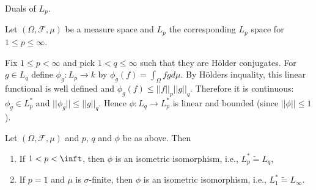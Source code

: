 

Duals of $L_p$.

Let $(\Omega,\mathcal{F},\mu)$ be a measure space
and $L_p$ the corresponding $L_p$ space for $1\leq p\leq\infty$.

Fix $1\leq p<\infty$ and pick $1<q\leq \infty$ such that they are H\"older conjugates.
For $g\in L_q$ define $\phi_g:L_p\to k$ by $\phi_g(f)=\int_\Omega fgd\mu$.
By H\"olders inquality, this linear functional is well defined and
$\phi_g(f)\leq ||f||_p||g||_q$.
Therefore it is continuous: $\phi_g\in L_p^*$
and $||\phi_g||\leq ||g||_q$.
Hence $\phi:L_q\to L_p^*$ is linear and bounded (since $||\phi||\leq 1$).

\begin{theorem}
Let $(\Omega,\mathcal{F},\mu)$ and $p$, $q$ and $\phi$ be as above.
Then
\begin{enumerate}
  \item If $1<p<\inft$, then $\phi$ is an isometric isomorphism, i.e., $L_p^* \tilde = L_q$,
  \item If $p=1$ and $\mu $ is $\sigma$-finite, then $\phi$ is an isometric isomorphism,
  i.e., $L_1^* \tilde = L_\infty$.
\end{enumerate}
\end{theorem}

